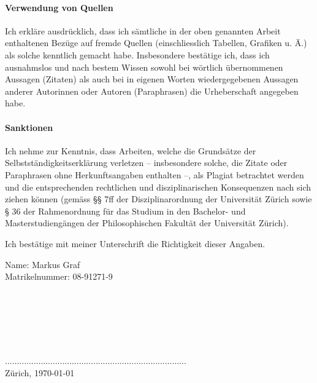 \documentclass[german,12pt,doc]{apa}
\begin{document}
\paragraph{Verwendung von Quellen} 
Ich erkläre ausdrücklich, dass ich sämtliche in der oben genannten Arbeit enthaltenen Bezüge auf fremde Quellen (einschliesslich Tabellen, Grafiken u. Ä.) als solche kenntlich gemacht habe. Insbesondere bestätige ich, dass ich ausnahmslos und nach bestem Wissen sowohl bei wörtlich übernommenen Aussagen (Zitaten) als auch bei in eigenen Worten wiedergegebenen Aussagen anderer Autorinnen oder Autoren (Paraphrasen) die Urheberschaft angegeben habe. 

\paragraph{Sanktionen}
Ich nehme zur Kenntnis, dass Arbeiten, welche die Grundsätze der 
Selbstständigkeitserklärung verletzen – insbesondere solche, die Zitate oder Paraphrasen ohne Herkunftsangaben enthalten –, als Plagiat betrachtet werden und die entsprechenden rechtlichen und disziplinarischen Konsequenzen nach sich ziehen können (gemäss §§ 7ff der Disziplinarordnung der Universität Zürich sowie § 36 der Rahmenordnung für das Studium in den Bachelor- und Masterstudiengängen der Philosophischen Fakultät der Universität Zürich). 

Ich bestätige mit meiner Unterschrift die Richtigkeit dieser Angaben.

Name: Markus Graf\\
Matrikelnummer:  08-91271-9\\
\\
\\
\\
\\
\\
\\
............................................................................\\
Zürich, \today
\end{document}
